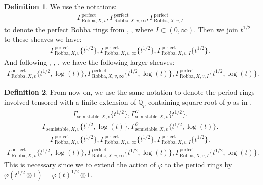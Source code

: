 \documentclass[12pt]{book}
\theoremstyle{definition}
\newtheorem{definition}{Definition}
\begin{document}
\begin{definition}
We use the notations:
\begin{align}
\Gamma^\mathrm{perfect}_{\text{Robba},X,v},\Gamma^\mathrm{perfect}_{\text{Robba},X,v,\infty},\Gamma^\mathrm{perfect}_{\text{Robba},X,v,I}
\end{align}
to denote the perfect Robba rings from \cite{KL1}, \cite{KL2}, where $I\subset (0,\infty)$. Then we join $t^{1/2}$ to these sheaves we have:
\begin{align}
\Gamma^\mathrm{perfect}_{\text{Robba},X,v}\{t^{1/2}\},\Gamma^\mathrm{perfect}_{\text{Robba},X,v,\infty}\{t^{1/2}\},\Gamma^\mathrm{perfect}_{\text{Robba},X,v,I}\{t^{1/2}\}.
\end{align}
And following \cite{BL1}, \cite{BL2}, \cite{Fon1}, \cite{BHS} we have the following larger sheaves:
\begin{align}
\Gamma^\mathrm{perfect}_{\text{Robba},X,v}\{t^{1/2},\log(t)\},\Gamma^\mathrm{perfect}_{\text{Robba},X,v,\infty}\{t^{1/2},\log(t)\},\Gamma^\mathrm{perfect}_{\text{Robba},X,v,I}\{t^{1/2},\log(t)\}.
\end{align} 
\end{definition}



\begin{definition}
From now on, we use the same notation to denote the period rings involved tensored with a finite extension of $\mathbb{Q}_p$ containing square root of $p$ as in \cite{BS}.
\begin{align}
\Gamma_{\text{semistable},X,v}\{t^{1/2}\},\Gamma^\mathcal{O}_{\text{semistable},X,v}\{t^{1/2}\}.
\end{align}
\begin{align}
\Gamma_{\text{semistable},X,v}\{t^{1/2},\log(t)\},\Gamma^\mathcal{O}_{\text{semistable},X,v}\{t^{1/2},\log(t)\}.
\end{align}
\begin{align}
\Gamma^\mathrm{perfect}_{\text{Robba},X,v}\{t^{1/2}\},\Gamma^\mathrm{perfect}_{\text{Robba},X,v,\infty}\{t^{1/2}\},\Gamma^\mathrm{perfect}_{\text{Robba},X,v,I}\{t^{1/2}\}.
\end{align}
\begin{align}
\Gamma^\mathrm{perfect}_{\text{Robba},X,v}\{t^{1/2},\log(t)\},\Gamma^\mathrm{perfect}_{\text{Robba},X,v,\infty}\{t^{1/2},\log(t)\},\Gamma^\mathrm{perfect}_{\text{Robba},X,v,I}\{t^{1/2},\log(t)\}.
\end{align}
This is necessary since we to extend the action of $\varphi$ to the period rings by $\varphi(t^{1/2}\otimes 1)=\varphi(t)^{1/2}\otimes 1$.
\end{definition}
\end{document}
